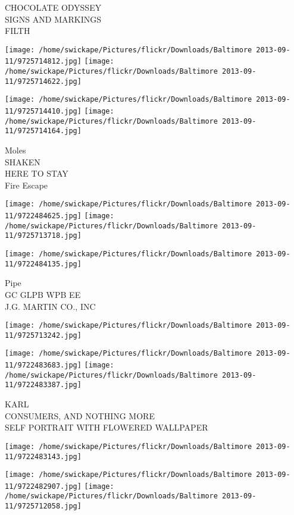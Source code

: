 \documentclass[10pt,letterpaper]{article}
\begin{document}
CHOCOLATE ODYSSEY\\
SIGNS AND MARKINGS\\
FILTH
\pagebreak

\texttt{[image: /home/swickape/Pictures/flickr/Downloads/Baltimore 2013-09-11/9725714812.jpg]}
\texttt{[image: /home/swickape/Pictures/flickr/Downloads/Baltimore 2013-09-11/9725714622.jpg]}

\texttt{[image: /home/swickape/Pictures/flickr/Downloads/Baltimore 2013-09-11/9725714410.jpg]}
\texttt{[image: /home/swickape/Pictures/flickr/Downloads/Baltimore 2013-09-11/9725714164.jpg]}

Moles\\
SHAKEN\\
HERE TO STAY\\
Fire Escape
\pagebreak

\texttt{[image: /home/swickape/Pictures/flickr/Downloads/Baltimore 2013-09-11/9722484625.jpg]}
\texttt{[image: /home/swickape/Pictures/flickr/Downloads/Baltimore 2013-09-11/9725713718.jpg]}

\vspace{0.25in}
\texttt{[image: /home/swickape/Pictures/flickr/Downloads/Baltimore 2013-09-11/9722484135.jpg]}

Pipe\\
GC GLPB WPB EE\\
J.G. MARTIN CO., INC
\pagebreak

\texttt{[image: /home/swickape/Pictures/flickr/Downloads/Baltimore 2013-09-11/9725713242.jpg]}

\vspace{0.25in}
\texttt{[image: /home/swickape/Pictures/flickr/Downloads/Baltimore 2013-09-11/9722483683.jpg]}
\texttt{[image: /home/swickape/Pictures/flickr/Downloads/Baltimore 2013-09-11/9722483387.jpg]}

KARL\\
CONSUMERS, AND NOTHING MORE\\
SELF PORTRAIT WITH FLOWERED WALLPAPER
\pagebreak

\texttt{[image: /home/swickape/Pictures/flickr/Downloads/Baltimore 2013-09-11/9722483143.jpg]}

\vspace{0.25in}
\texttt{[image: /home/swickape/Pictures/flickr/Downloads/Baltimore 2013-09-11/9722482907.jpg]}
\texttt{[image: /home/swickape/Pictures/flickr/Downloads/Baltimore 2013-09-11/9725712058.jpg]}
\end{document}

